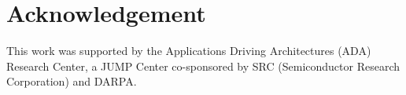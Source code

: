 \section{Acknowledgement}
This work was supported by the Applications Driving Architectures (ADA)
Research Center, a JUMP Center co-sponsored by SRC (Semiconductor
Research Corporation) and DARPA.